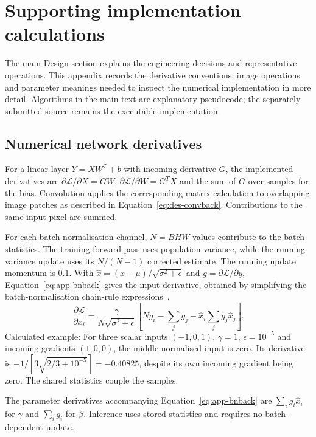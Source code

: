 \section{Supporting implementation calculations}
\label{app:des-implementation}
The main Design section explains the engineering decisions and representative operations. This appendix records the derivative conventions, image operations and parameter meanings needed to inspect the numerical implementation in more detail. Algorithms in the main text are explanatory pseudocode; the separately submitted source remains the executable implementation.

\subsection{Numerical network derivatives}
\label{app:des-derivatives}
For a linear layer $Y=XW^T+b$ with incoming derivative $G$, the implemented derivatives are $\partial\mathcal L/\partial X=GW$, $\partial\mathcal L/\partial W=G^TX$ and the sum of $G$ over samples for the bias. Convolution applies the corresponding matrix calculation to overlapping image patches as described in Equation~\ref{eq:des-convback}. Contributions to the same input pixel are summed.


For each batch-normalisation channel, $N=BHW$ values contribute to the batch statistics. The training forward pass uses population variance, while the running variance update uses its $N/(N-1)$ corrected estimate. The running update momentum is 0.1. With $\widehat x=(x-\mu)/\sqrt{\sigma^2+\epsilon}$ and $g=\partial\mathcal L/\partial y$, Equation~\ref{eq:app-bnback} gives the input derivative, obtained by simplifying the batch-normalisation chain-rule expressions~\cite[PDF p.~4]{ioffe2015}.
\begin{equation}
\frac{\partial\mathcal L}{\partial x_i}=
\frac{\gamma}{N\sqrt{\sigma^2+\epsilon}}
\left[Ng_i-\sum_jg_j-\widehat x_i\sum_jg_j\widehat x_j\right].
\label{eq:app-bnback}
\end{equation}
Calculated example: For three scalar inputs $(-1,0,1)$, $\gamma=1$, $\epsilon=10^{-5}$ and incoming gradients $(1,0,0)$, the middle normalised input is zero. Its derivative is $-1/[3\sqrt{2/3+10^{-5}}]=-0.40825$, despite its own incoming gradient being zero. The shared statistics couple the samples.

The parameter derivatives accompanying Equation~\ref{eq:app-bnback} are $\sum_i g_i\widehat x_i$ for $\gamma$ and $\sum_i g_i$ for $\beta$. Inference uses stored statistics and requires no batch-dependent update.

